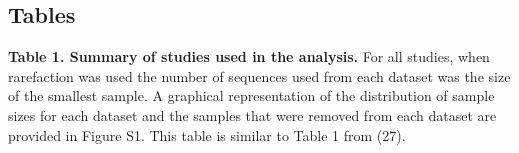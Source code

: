 \documentclass[
]{article}
\begin{document}

\setlength{\parindent}{0in}
\setlength{\leftskip}{0in}

\newpage

\hypertarget{tables}{%
\subsection{Tables}\label{tables}}

\textbf{Table 1. Summary of studies used in the analysis.} For all
studies, when rarefaction was used the number of sequences used from
each dataset was the size of the smallest sample. A graphical
representation of the distribution of sample sizes for each dataset and
the samples that were removed from each dataset are provided in Figure
S1. This table is similar to Table 1 from (27).

\footnotesize
\end{document}
